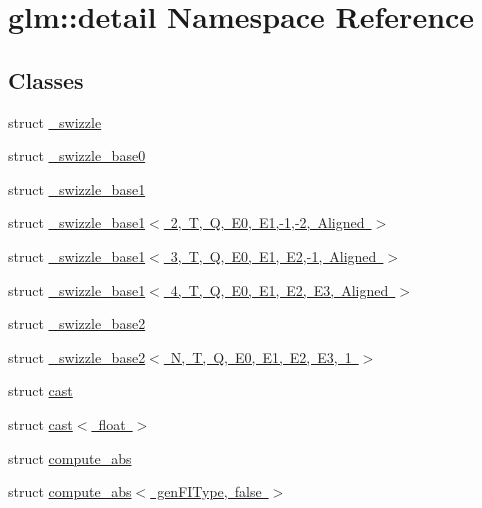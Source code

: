 \hypertarget{namespaceglm_1_1detail}{}\section{glm\+:\+:detail Namespace Reference}
\label{namespaceglm_1_1detail}
\subsection*{Classes}
\begin{DoxyCompactItemize}
\item 
struct \mbox{\hyperlink{structglm_1_1detail_1_1__swizzle}{\+\_\+swizzle}}
\item 
struct \mbox{\hyperlink{structglm_1_1detail_1_1__swizzle__base0}{\+\_\+swizzle\+\_\+base0}}
\item 
struct \mbox{\hyperlink{structglm_1_1detail_1_1__swizzle__base1}{\+\_\+swizzle\+\_\+base1}}
\item 
struct \mbox{\hyperlink{structglm_1_1detail_1_1__swizzle__base1_3_012_00_01_t_00_01_q_00_01_e0_00_01_e1_00-1_00-2_00_01_aligned_01_4}{\+\_\+swizzle\+\_\+base1$<$ 2, T, Q, E0, E1,-\/1,-\/2, Aligned $>$}}
\item 
struct \mbox{\hyperlink{structglm_1_1detail_1_1__swizzle__base1_3_013_00_01_t_00_01_q_00_01_e0_00_01_e1_00_01_e2_00-1_00_01_aligned_01_4}{\+\_\+swizzle\+\_\+base1$<$ 3, T, Q, E0, E1, E2,-\/1, Aligned $>$}}
\item 
struct \mbox{\hyperlink{structglm_1_1detail_1_1__swizzle__base1_3_014_00_01_t_00_01_q_00_01_e0_00_01_e1_00_01_e2_00_01_e3_00_01_aligned_01_4}{\+\_\+swizzle\+\_\+base1$<$ 4, T, Q, E0, E1, E2, E3, Aligned $>$}}
\item 
struct \mbox{\hyperlink{structglm_1_1detail_1_1__swizzle__base2}{\+\_\+swizzle\+\_\+base2}}
\item 
struct \mbox{\hyperlink{structglm_1_1detail_1_1__swizzle__base2_3_01_n_00_01_t_00_01_q_00_01_e0_00_01_e1_00_01_e2_00_01_e3_00_011_01_4}{\+\_\+swizzle\+\_\+base2$<$ N, T, Q, E0, E1, E2, E3, 1 $>$}}
\item 
struct \mbox{\hyperlink{structglm_1_1detail_1_1cast}{cast}}
\item 
struct \mbox{\hyperlink{structglm_1_1detail_1_1cast_3_01float_01_4}{cast$<$ float $>$}}
\item 
struct \mbox{\hyperlink{structglm_1_1detail_1_1compute__abs}{compute\+\_\+abs}}
\item 
struct \mbox{\hyperlink{structglm_1_1detail_1_1compute__abs_3_01gen_f_i_type_00_01false_01_4}{compute\+\_\+abs$<$ gen\+F\+I\+Type, false $>$}}

\end{DoxyCompactItemize}
